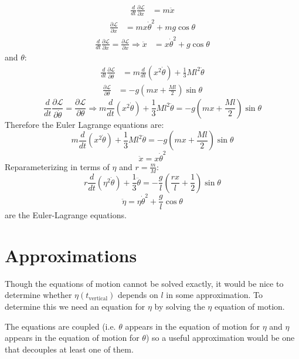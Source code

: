 \documentclass[9pt]{report}
\begin{document}
\begin{enumerate}
\[\begin{align}
\frac{d}{dt} \frac{\partial \mathcal{L}}{\partial\dot{x}} &= m \ddot{x}
\end{align}
\]
\[
\begin{align}
\frac{\partial \mathcal{L}}{\partial x} &= m x \dot{\theta}^2 + mg\cos\theta 
\end{align}
\]
\[
\begin{align}
 \frac{d}{dt} \frac{\partial \mathcal{L}}{\partial\dot{x}} = \frac{\partial \mathcal{L}}{\partial x} \Rightarrow \ddot{x} &= x \dot{\theta}^2 + g \cos \theta 
\end{align}
\]
and $\theta$:
\[
\begin{align}
\frac{d}{dt} \frac{\partial \mathcal{L}}{\partial\dot{\theta}} &= m \frac{d}{dt}(x^2\dot{\theta}) + \frac{1}{3} Ml^2 \ddot{\theta}
\end{align}
\]
\[
\begin{align}
\frac{\partial \mathcal{L}}{\partial \theta} &= -g (mx + \frac{Ml}{2}) \sin \theta
\end{align}
\]
\[
\frac{d}{dt} \frac{\partial \mathcal{L}}{\partial\dot{\theta}} = \frac{\partial \mathcal{L}}{\partial \theta} \Rightarrow m \frac{d}{dt}(x^2\dot{\theta}) + \frac{1}{3} Ml^2 \ddot{\theta}
= -g(mx + \frac{Ml}{2}) \sin \theta
\]
Therefore the Euler Lagrange equations are:
\[
m \frac{d}{dt}(x^2\dot{\theta}) + \frac{1}{3} Ml^2 \ddot{\theta} = -g (mx + \frac{Ml}{2}) \sin \theta \label{el_theta}
\]
\[
\ddot{x} = x \dot{\theta}^2 \label{el_x}
\]
Reparameterizing in terms of $\eta$ and $r=\frac{m}{M}$:
\begin{equation}
r \frac{d}{dt}(\eta^2\dot{\theta}) + \frac{1}{3}\ddot{\theta} = -\frac{g}{l} (\frac{rx}{l} + \frac{1}{2}) \sin \theta \label{el_eta}
\end{equation}
\begin{equation}
\ddot{\eta} = \eta \dot{\theta}^2 \label{el_theta} + \frac{g}{l}\cos \theta 
\end{equation}
are the Euler-Lagrange equations.

\section{Approximations}
Though the equations of motion cannot be solved exactly, it would be nice to 
determine whether $\eta(t_\text{vertical})$ depends on $l$ in some approximation.
To determine this we need an equation for $\eta$ by solving the $\eta$ equation
of motion.


The equations are coupled (i.e. $\theta$ appears in the equation of motion for
$\eta$ and $\eta$ appears in the equation of motion for $\theta$) so a useful
approximation would be one that decouples at least one of them.


\end{enumerate}
\end{document}
